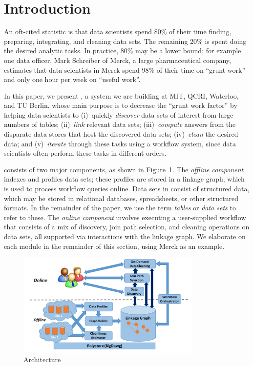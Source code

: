 \section{Introduction}
\label{introduction}

An oft-cited statistic is that data scientists spend 80\% of their time finding,
preparing, integrating, and cleaning data sets. The remaining 20\% is spent doing
the desired analytic tasks. In practice, 80\% may be a lower bound; for example
one data officer, Mark Schreiber of Merck, a large pharmaceutical company,
estimates that data scientists in Merck spend 98\% of their time on ``grunt
work'' and only one hour per week on ``useful work''.

In this paper, we present \dcv, a system we are building at MIT, QCRI, Waterloo,
and TU Berlin, whose main purpose is to decrease the ``grunt work factor'' by
helping data scientists to (i)~quickly {\it discover} data sets of interest from
large numbers of tables; (ii)~{\it link} relevant data sets; (iii)~{\it compute} answers from the
disparate data stores that host the discovered data sets; (iv)~{\it clean} the
desired data; and (v)~{\it iterate} through these tasks using a workflow
system, since data scientists often perform these tasks in different orders.


\dcv consists of two major components, as shown in Figure~\ref{fig:arch}.  The
{\it offline component} indexes and profiles data sets;  these profiles are
stored  in a linkage graph, which is used to process workflow queries online.
Data sets in \dcv consist of structured data, which may be stored in relational
databases, spreadsheets, or other structured formats. In the remainder of the
paper, we use the term {\it tables} or {\it data sets} to refer to these.  The
{\it online component} involves executing a user-supplied workflow that consists
of a mix of discovery, join path selection, and cleaning operations on data
sets, all supported via interactions with the linkage graph. We elaborate on
each module in the remainder of this section, using Merck as an example.


\begin{figure}[!t]
\includegraphics[width=3.6in]{arch3.pdf}
\caption{\dcv Architecture}
\label{fig:arch}
\end{figure}


